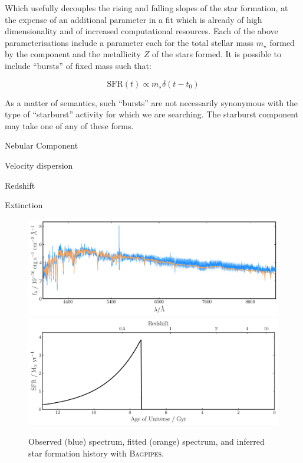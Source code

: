 \documentclass[a4paper,11pt]{article}
\begin{document}
\noindent Which usefully decouples the rising and falling slopes of the star formation, at the expense of an additional parameter in a fit which is already of high dimensionality and of increased computational resources.\cite{Carnall_2018} Each of the above parameterisations include a parameter each for the total stellar mass $m_\star$ formed by the component and the metallicity $Z$ of the stars formed. It is possible to include ``bursts'' of fixed mass such that:

\begin{equation}
  \mathrm{SFR}(t)\propto
  m_\star \delta(t-t_0)
\end{equation}

\noindent As a matter of semantics, such ``bursts'' are not necessarily synonymous with the type of ``starburst'' activity for which we are searching. The starburst component may take one of any of these forms.

Nebular Component

Velocity dispersion

Redshift

Extinction

\begin{figure}
  \includegraphics[width=\textwidth]{host_hyz_specwerr_fit}
  \includegraphics[width=\textwidth]{host_hyz_specwerr_sfh}
  \caption{Observed (blue) spectrum, fitted (orange) spectrum, and inferred star formation history with \textsc{Bagpipes}.}
  \label{fig:bagpipes_example_fit}
\end{figure}
\end{document}
